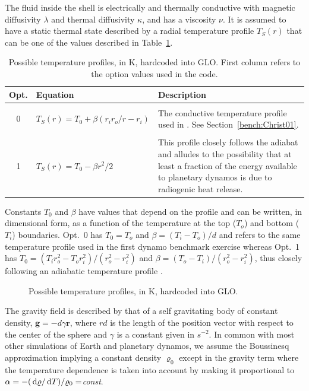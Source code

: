 \documentclass[a4paper,10pt]{book}
\newcommand{\de}{{\rm \, d}}
\renewcommand{\vec}[1]{\mathbf{#1}}
\begin{document}
The fluid inside the shell is electrically and thermally conductive with
magnetic diffusivity $\lambda$ and thermal diffusivity $\kappa$, and has a
viscosity $\nu$. It is assumed to have a static thermal state described by a
radial temperature profile $T_S (r)$ that can be one of the values described in
Table~\ref{t:t_profiles}.
\begin{table}[htb]
\centering
\begin{tabular}{|c|lp{}|}\hline
 Opt. & Equation & Description\\\hline
  &                          & \\
 0&$T_S(r) = T_0 + \beta(r_i r_o/r - r_i)$ & The conductive temperature
 profile used in \citep{ChristensenEtAl01}. See Section~\ref{bench:Christ01}.
 \\\hline
  &                          & \\
 1&$T_S(r) = T_0 - \beta r^2/2$    & This profile closely
follows the adiabat \citep{LabrossePoirier1997,DaviesGubbins2011} and alludes to
the possibility that at least a fraction of the energy available to planetary
dynamos is due to radiogenic heat release. \\ \hline
\end{tabular}
\caption{Possible temperature profiles, in K, hardcoded into GLO. First column
refers to the option values used in the code.}
\label{t:t_profiles}
\end{table}

Constants $T_0$ and $\beta$ have values that depend on the profile and can be
written, in dimensional form, as a function of the temperature at the top
($T_o$) and bottom ($T_i$) boundaries. Opt.~0 has $T_0 = T_o$ and $\beta = (T_i
-T_o)/d$ and refers to the same temperature profile used in the first dynamo
benchmark exercise \citep{ChristensenEtAl01} whereas Opt.~1 has $T_0 = (T_i
r_o^2 - T_o r_i^2)/(r_o^2 - r_i^2)$ and $\beta = (T_o - T_i)/(r_o^2 - r_i^2)$,
thus closely following an adiabatic temperature profile
\citep{LabrossePoirier1997, DaviesGubbins2011}.

\begin{figure}[htb]
\centering
 
 \caption{Possible temperature profiles, in K, hardcoded into GLO.}
\end{figure}

The gravity field is described by that of a self gravitating body of constant
density, $\vec g = - d \gamma \vec r$, where $rd$ is the length of the position
vector with respect to the center of the sphere and $\gamma$ is a constant given
in $s^{-2}$. In common with most other simulations of Earth and planetary
dynamos, we assume the Boussinesq approximation implying a constant density
$\varrho_0$ except in the gravity term where the temperature dependence is taken
into account by making it proportional to $\alpha = - ( \de\varrho/\de
T)/\varrho_0 =${\sl const}.
\end{document}
